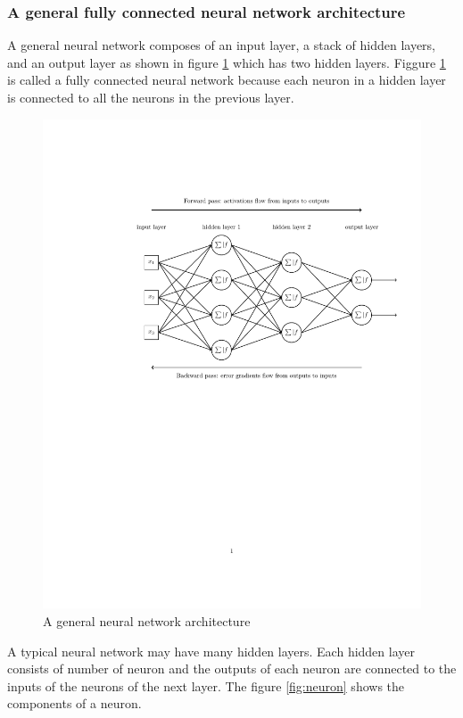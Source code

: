 \documentclass{article}
\begin{document}
\subsubsection{A general fully connected neural network architecture } \label{FCNN}
A general neural network composes of an input layer, a stack of hidden layers, and an output layer as shown in figure \ref{fig:NN} which has two hidden layers. Figgure \ref{fig:NN} is called a fully connected neural network because each neuron in a hidden layer is connected to all the neurons in the previous layer.
\begin{figure}[h]
	\includegraphics[width=.75\textwidth]{NN.pdf}
	\caption{A general neural network architecture}
	\label{fig:NN}
\end{figure}
A typical neural network may have many hidden layers. Each hidden layer consists of number of neuron and the outputs of each neuron are connected to the inputs of the neurons of the next layer.
The figure \ref{fig:neuron} shows the components of a neuron. 
\end{document}
